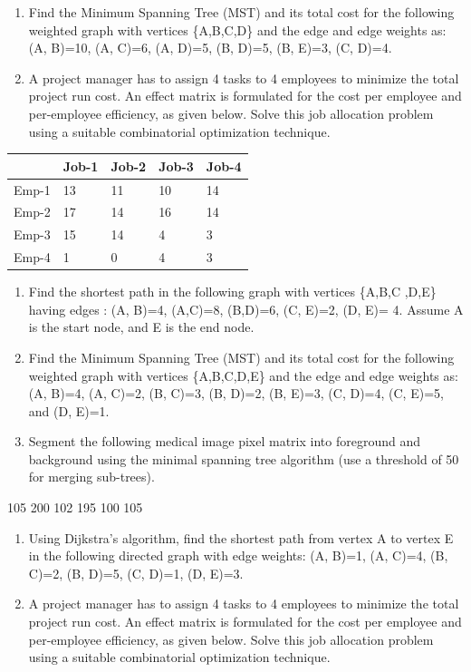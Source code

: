 \documentclass[
  letterpaper,
  DIV=11,
  numbers=noendperiod]{scrreprt}
\providecommand{\tightlist}{%
  \setlength{\itemsep}{0pt}\setlength{\parskip}{0pt}}
\begin{document}
\begin{enumerate}
\def\labelenumi{\arabic{enumi}.}
\setcounter{enumi}{2}
\item
  Find the Minimum Spanning Tree (MST) and its total cost for the
  following weighted graph with vertices \{A,B,C,D\} and the edge and
  edge weights as: (A, B)=10, (A, C)=6, (A, D)=5, (B, D)=5, (B, E)=3,
  (C, D)=4.
\item
  A project manager has to assign 4 tasks to 4 employees to minimize the
  total project run cost. An effect matrix is formulated for the cost
  per employee and per-employee efficiency, as given below. Solve this
  job allocation problem using a suitable combinatorial optimization
  technique.
\end{enumerate}

\begin{longtable}[]{@{}lllll@{}}
\toprule\noalign{}
& Job-1 & Job-2 & Job-3 & Job-4 \\
\midrule\noalign{}
\endhead
\bottomrule\noalign{}
\endlastfoot
Emp-1 & 13 & 11 & 10 & 14 \\
Emp-2 & 17 & 14 & 16 & 14 \\
Emp-3 & 15 & 14 & 4 & 3 \\
Emp-4 & 1 & 0 & 4 & 3 \\
\end{longtable}

\begin{enumerate}
\def\labelenumi{\arabic{enumi}.}
\setcounter{enumi}{4}
\item
  Find the shortest path in the following graph with vertices \{A,B,C
  ,D,E\} having edges : (A, B)=4, (A,C)=8, (B,D)=6, (C, E)=2, (D, E)= 4.
  Assume A is the start node, and E is the end node.
\item
  Find the Minimum Spanning Tree (MST) and its total cost for the
  following weighted graph with vertices \{A,B,C,D,E\} and the edge and
  edge weights as: (A, B)=4, (A, C)=2, (B, C)=3, (B, D)=2, (B, E)=3, (C,
  D)=4, (C, E)=5, and (D, E)=1.
\item
  Segment the following medical image pixel matrix into foreground and
  background using the minimal spanning tree algorithm (use a threshold
  of 50 for merging sub-trees).
\end{enumerate}

\textbar{} 105\textbar{} 200\textbar{} \textbar{}
102\textbar{} 195\textbar{} \textbar{} 100\textbar{}
105\textbar{}

\begin{enumerate}
\def\labelenumi{\arabic{enumi}.}
\setcounter{enumi}{6}
\tightlist
\item
  Using Dijkstra's algorithm, find the shortest path from vertex A to
  vertex E in the following directed graph with edge weights: (A, B)=1,
  (A, C)=4, (B, C)=2, (B, D)=5, (C, D)=1, (D, E)=3.
\item
  A project manager has to assign 4 tasks to 4 employees to minimize the
  total project run cost. An effect matrix is formulated for the cost
  per employee and per-employee efficiency, as given below. Solve this
  job allocation problem using a suitable combinatorial optimization
  technique.
\end{enumerate}
\end{document}
